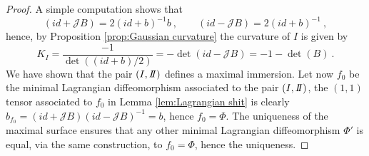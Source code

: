 \begin{proof}
    A simple computation shows that 
    \begin{equation}\label{eq:roba}
        (id+ \mathcal{J}B) = 2(id +b)^{-1} b  \ , \qquad (id- \mathcal{J}B) = 2(id +b)^{-1} \ ,
    \end{equation}
     hence, by Proposition \ref{prop:Gaussian curvature} the curvature of $I$ is given by
    \[
        K_I = \frac{-1}{\det((id+b)/2)} = -\det(id - \mathcal{J}B) = -1 - \det(B) \ .
    \]
    We have shown that the pair $(\I,\II)$ defines a maximal immersion.
    Let now $f_0$ be the minimal Lagrangian diffeomorphism associated to the pair $(I,\II)$, the $(1,1)$ tensor associated to $f_0$ in Lemma \ref{lem:Lagrangian shit} is clearly $b_{f_0} = (id+\mathcal{J}B)(id-\mathcal{J}B)^{-1} = b$, hence $f_0 = \Phi$. The uniqueness of the maximal surface ensures that any other minimal Lagrangian diffeomorphism $\Phi'$ is equal, via the same construction, to $f_0=\Phi$, hence the uniqueness.
\end{proof}
